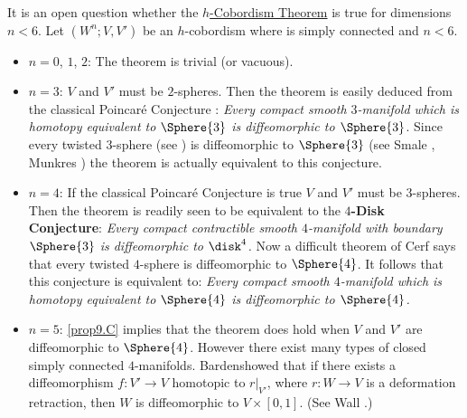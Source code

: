 It is an open question whether the \hyperref[thm9.1]{$h$-Cobordism Theorem} is true for dimensions $n < 6$. Let $(W^n; V, V')$ be an $h$-cobordism where is simply connected and $n < 6$.
\begin{itemize}%
	\item $n=0$, $1$, $2$: The theorem is trivial (or vacuous).
	
	\item $n=3$: $V$ and $V'$ must be $2$-spheres. Then the theorem is
	easily deduced from the classical Poincar\'{e} Conjecture {\protect\footnotemark[1]}: \emph{Every
	compact smooth $3$-manifold which is homotopy equivalent to $\Sphere{3}$
	is diffeomorphic to $\Sphere{3}$}. Since every twisted $3$-sphere (see ) is diffeomorphic to $\Sphere{3}$ (see Smale \cite{30}, Munkres \cite{31})
	the theorem is actually equivalent to this conjecture.
	
	\item $n=4$: If the classical Poincar\'{e} Conjecture is true $V$ and $V'$
	must be $3$-spheres. Then the theorem is readily seen to be
	equivalent to the \textbf{$4$-Disk Conjecture}: \emph{Every compact contractible smooth $4$-manifold with boundary $\Sphere{3}$ is diffeomorphic to
	$\disk^4$.} Now a difficult theorem of Cerf \cite{29} says that every twisted $4$-sphere is diffeomorphic to $\Sphere{4}$. It follows that this 
	conjecture is equivalent to: \emph{Every compact smooth $4$-manifold which
	is homotopy equivalent to $\Sphere{4}$ is diffeomorphic to $\Sphere{4}$.}
	\item $n=5$:  \cref{prop9.C} implies that the theorem does hold when $V$ and $V'$ are diffeomorphic to $\Sphere{4}$. However there exist many
	types of closed simply connected $4$-manifolds. Barden\footnotemark[2]
	showed that if there exists a diffeomorphism $f\mathpunct{:}V'\to V$
	homotopic to $r\vert_{V'}$, where $r\mathpunct{:}W\to V$ is a deformation
	retraction, then $W$ is diffeomorphic to $V \times [0, 1]$. (See
	Wall \cite{37,38}.)
\end{itemize}







\nocite{1,2,3,4,5,6,7,8,9,10,11,12,13,14,15,16,17,18,19,20,21,22,23,24,25,26,27,28,29,30,31,32,33,34,35,36,37,38,39}
